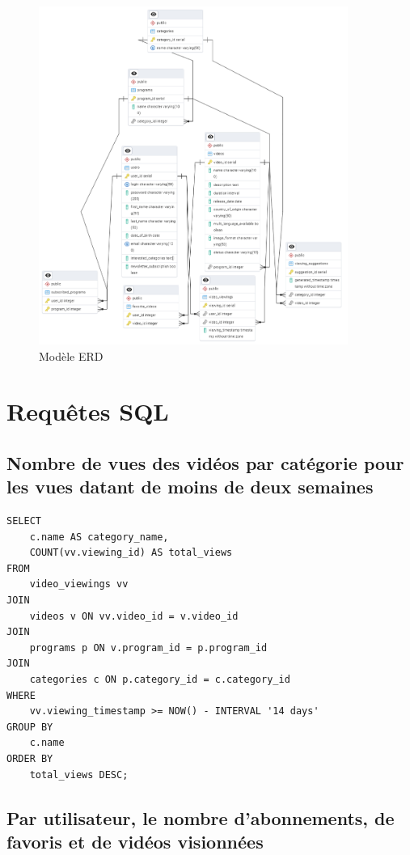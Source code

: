 \documentclass[a4paper,12pt]{article}
\begin{document}
\begin{figure}[h!]
    \centering
    \includegraphics[width=0.9\textwidth]{photo3.jpg}
    \caption{Modèle ERD}
\end{figure}

\section{Requêtes SQL}

\subsection{Nombre de vues des vidéos par catégorie pour les vues datant de moins de deux semaines}

\begin{lstlisting}
SELECT 
    c.name AS category_name,
    COUNT(vv.viewing_id) AS total_views
FROM 
    video_viewings vv
JOIN 
    videos v ON vv.video_id = v.video_id
JOIN 
    programs p ON v.program_id = p.program_id
JOIN 
    categories c ON p.category_id = c.category_id
WHERE 
    vv.viewing_timestamp >= NOW() - INTERVAL '14 days'
GROUP BY 
    c.name
ORDER BY 
    total_views DESC;
\end{lstlisting}

\subsection{Par utilisateur, le nombre d'abonnements, de favoris et de vidéos visionnées}
\end{document}
